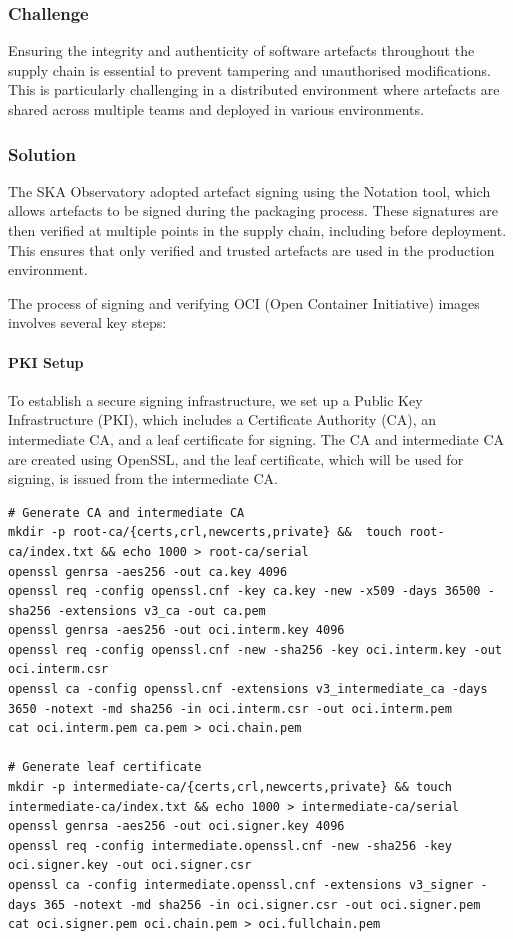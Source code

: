 \documentclass[a4paper]{spie}  %
\begin{document}
\subsubsection{Challenge}

Ensuring the integrity and authenticity of software artefacts throughout the supply chain is essential to prevent tampering and unauthorised modifications. This is particularly challenging in a distributed environment where artefacts are shared across multiple teams and deployed in various environments.

\subsubsection{Solution}

The SKA Observatory adopted artefact signing using the Notation tool\cite{NotaryProject}, which allows artefacts to be signed during the packaging process. These signatures are then verified at multiple points in the supply chain, including before deployment. This ensures that only verified and trusted artefacts are used in the production environment.

The process of signing and verifying OCI (Open Container Initiative) images involves several key steps:

\paragraph{PKI Setup}
To establish a secure signing infrastructure, we set up a Public Key Infrastructure (PKI), which includes a Certificate Authority (CA), an intermediate CA, and a leaf certificate for signing. The CA and intermediate CA are created using OpenSSL, and the leaf certificate, which will be used for signing, is issued from the intermediate CA.

\begin{lstlisting}
# Generate CA and intermediate CA
mkdir -p root-ca/{certs,crl,newcerts,private} &&  touch root-ca/index.txt && echo 1000 > root-ca/serial
openssl genrsa -aes256 -out ca.key 4096
openssl req -config openssl.cnf -key ca.key -new -x509 -days 36500 -sha256 -extensions v3_ca -out ca.pem
openssl genrsa -aes256 -out oci.interm.key 4096
openssl req -config openssl.cnf -new -sha256 -key oci.interm.key -out oci.interm.csr
openssl ca -config openssl.cnf -extensions v3_intermediate_ca -days 3650 -notext -md sha256 -in oci.interm.csr -out oci.interm.pem
cat oci.interm.pem ca.pem > oci.chain.pem

# Generate leaf certificate
mkdir -p intermediate-ca/{certs,crl,newcerts,private} && touch intermediate-ca/index.txt && echo 1000 > intermediate-ca/serial
openssl genrsa -aes256 -out oci.signer.key 4096
openssl req -config intermediate.openssl.cnf -new -sha256 -key oci.signer.key -out oci.signer.csr
openssl ca -config intermediate.openssl.cnf -extensions v3_signer -days 365 -notext -md sha256 -in oci.signer.csr -out oci.signer.pem
cat oci.signer.pem oci.chain.pem > oci.fullchain.pem
\end{lstlisting}
\end{document}
